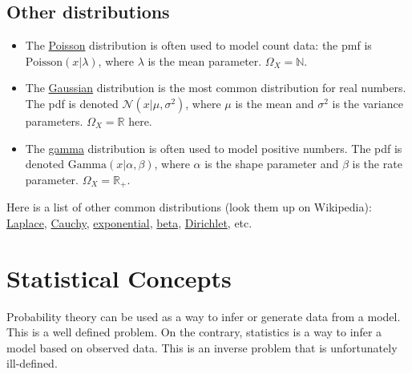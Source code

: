 \documentclass[12pt]{report}
\renewcommand{\emph}[1]{\color{violet}#1\color{black}{}}
\begin{document}
\subsection{Other distributions}
\begin{itemize}
\item The \href{https://en.wikipedia.org/wiki/Poisson_distribution}{Poisson} distribution is often used to model count data: the pmf is $\text{Poisson}(x | \lambda)$, where $\lambda$ is the mean parameter. $\Omega_X = \mathbb{N}$.
\item The \href{https://en.wikipedia.org/wiki/Normal_distribution}{Gaussian} distribution is the most common distribution for real numbers. The pdf is denoted $\mathcal{N}(x | \mu, \sigma^2)$, where $\mu$ is the mean and $\sigma^2$ is the variance parameters.  $\Omega_X = \mathbb{R}$ here.
\item The \href{https://en.wikipedia.org/wiki/Gamma_distribution}{gamma} distribution is often used to model positive numbers. The pdf is denoted $\text{Gamma}(x | \alpha, \beta)$, where $\alpha$ is the shape parameter and $\beta$ is the rate parameter. $\Omega_X = \mathbb{R_+}$.
\end{itemize}
Here is a list of other common distributions (look them up on Wikipedia):
\href{https://en.wikipedia.org/wiki/Laplace_distribution}{Laplace},
\href{https://en.wikipedia.org/wiki/Cauchy_distribution}{Cauchy},
\href{https://en.wikipedia.org/wiki/Exponential_distribution}{exponential},
\href{https://en.wikipedia.org/wiki/Beta_distribution}{beta},
\href{https://en.wikipedia.org/wiki/Dirichlet_distribution}{Dirichlet},
etc.


\section{Statistical Concepts}

\emph{Probability theory} can be used as a way to infer or generate data from a model. This is a well defined problem. On the contrary, \emph{statistics} is a way to infer a model based on observed data. This is an inverse problem that is unfortunately ill-defined.


\begin{figure}[H]\centering
\end{figure}
\end{document}
